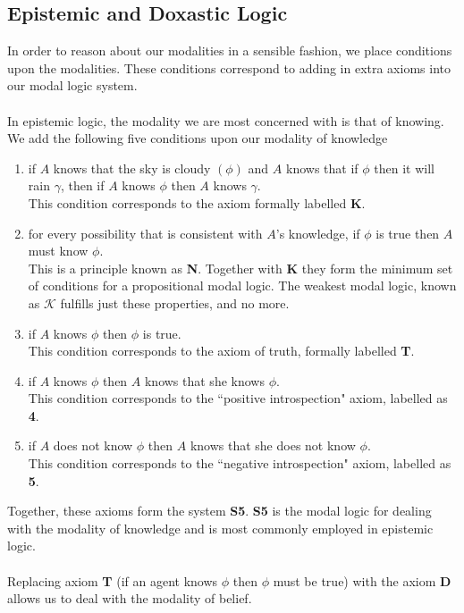 \documentclass[12pt, a4paper, twoside]{article}
\begin{document}
\subsection{Epistemic and Doxastic Logic}\label{epistemic_logics}
In order to reason about our modalities in a sensible fashion, we place
conditions upon the modalities.
These conditions correspond to adding in extra axioms into our modal logic
system. \citep{hoek2008dynamic}\\
\\
In epistemic logic, the modality we are most concerned with is that of knowing.
We add the following five conditions upon our modality of knowledge
\begin{enumerate}
	\item if $A$ knows that the sky is cloudy $(\phi)$ and $A$ knows that if
	$\phi$ then it will rain $\gamma$, then if $A$ knows $\phi$ then $A$ knows
	$\gamma$.\\
	This condition corresponds to the axiom formally labelled {\bf K}.
	\item for every possibility that is consistent with $A$'s knowledge, if $\phi$
	is true then $A$ must know $\phi$.\\
	This is a principle known as {\bf N}.
	Together with {\bf K} they form the minimum set of conditions for a
	propositional modal logic.
	The weakest modal logic, known as $\mathcal{K}$ fulfills just these
	properties, and no more.
	\item if $A$ knows $\phi$ then $\phi$ is true.\\
	This condition corresponds to the axiom of truth, formally labelled {\bf T}.
	\item if $A$ knows $\phi$ then $A$ knows that she knows $\phi$.\\
	This condition corresponds to the ``positive introspection" axiom, labelled 
	as {\bf 4}.
	\item if $A$ does not know $\phi$ then $A$ knows that she does not know
	$\phi$.\\
	This condition corresponds to the ``negative introspection" axiom, labelled 
	as {\bf 5}.
\end{enumerate}
Together, these axioms form the system {\bf S5}.
{\bf S5} is the modal logic for dealing with the modality of knowledge and is
most commonly employed in epistemic logic.\\
\\
Replacing axiom {\bf T} (if an agent knows $\phi$ then $\phi$ must be true) with
the axiom {\bf D} allows us to deal with the modality of belief.
\end{document}
